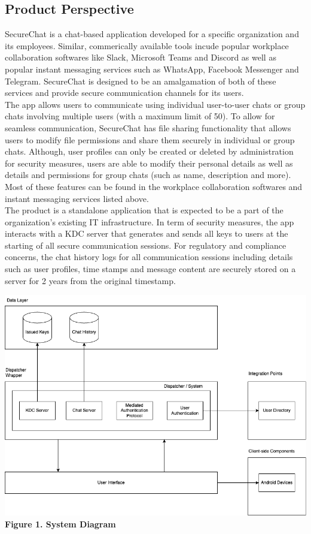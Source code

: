 \documentclass[]{article}
\begin{document}
\subsection{Product Perspective}
\label{sub:product_perspective}
SecureChat is a chat-based application developed for a specific organization and its employees. Similar, commerically available tools incude popular workplace collaboration softwares like Slack, Microsoft Teams and Discord as well as popular instant messaging services such as WhatsApp, Facebook Messenger and Telegram. SecureChat is designed to be an amalgamation of both of these services and provide secure communication channels for its users.\\
\newline
The app allows users to communicate using individual user-to-user chats or group chats involving multiple users (with a maximum limit of 50). To allow for seamless communication, SecureChat has file sharing functionality that allows users to modify file permissions and share them securely in individual or group chats. Although, user profiles can only be created or deleted by administration for security measures, users are able to modify their personal details as well as details and permissions for group chats (such as name, description and more). Most of these features can be found in the workplace collaboration softwares and instant messaging services listed above.\\
\newline
The product is a standalone application that is expected to be a part of the organization's existing IT infrastructure. In term of security measures, the app interacts with a KDC server that generates and sends all keys to users at the starting of all secure communication sessions. For regulatory and compliance concerns, the chat history logs for all communication sessions including details such as user profiles, time stamps and message content are securely stored on a server for 2 years from the original timestamp.\\
\newline
\begin{center}
\includegraphics[scale=0.5]{system-diagram.png}\\
\caption{\textbf{Figure 1. System Diagram}}
\end{center}
\end{document}
